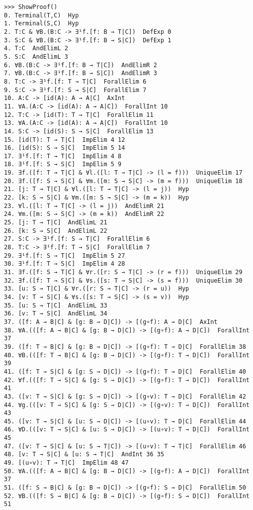 \documentclass[a4paper,12pt,leqno]{article}
\numberwithin{equation}{section}
\begin{document}
\begin{verbatim}
>>> ShowProof()
0. Terminal(T,C)  Hyp 
1. Terminal(S,C)  Hyp 
2. T:C & ∀B.(B:C -> ∃¹f.[f: B → T|C])  DefExp 0
3. S:C & ∀B.(B:C -> ∃¹f.[f: B → S|C])  DefExp 1
4. T:C  AndElimL 2
5. S:C  AndElimL 3
6. ∀B.(B:C -> ∃¹f.[f: B → T|C])  AndElimR 2
7. ∀B.(B:C -> ∃¹f.[f: B → S|C])  AndElimR 3
8. T:C -> ∃¹f.[f: T → T|C]  ForallElim 6
9. S:C -> ∃¹f.[f: S → S|C]  ForallElim 7
10. A:C -> [id(A): A → A|C]  AxInt 
11. ∀A.(A:C -> [id(A): A → A|C])  ForallInt 10
12. T:C -> [id(T): T → T|C]  ForallElim 11
13. ∀A.(A:C -> [id(A): A → A|C])  ForallInt 10
14. S:C -> [id(S): S → S|C]  ForallElim 13
15. [id(T): T → T|C]  ImpElim 4 12
16. [id(S): S → S|C]  ImpElim 5 14
17. ∃¹f.[f: T → T|C]  ImpElim 4 8
18. ∃¹f.[f: S → S|C]  ImpElim 5 9
19. ∃f.([f: T → T|C] & ∀l.([l: T → T|C] -> (l = f)))  UniqueElim 17
20. ∃f.([f: S → S|C] & ∀m.([m: S → S|C] -> (m = f)))  UniqueElim 18
21. [j: T → T|C] & ∀l.([l: T → T|C] -> (l = j))  Hyp 
22. [k: S → S|C] & ∀m.([m: S → S|C] -> (m = k))  Hyp 
23. ∀l.([l: T → T|C] -> (l = j))  AndElimR 21
24. ∀m.([m: S → S|C] -> (m = k))  AndElimR 22
25. [j: T → T|C]  AndElimL 21
26. [k: S → S|C]  AndElimL 22
27. S:C -> ∃¹f.[f: S → T|C]  ForallElim 6
28. T:C -> ∃¹f.[f: T → S|C]  ForallElim 7
29. ∃¹f.[f: S → T|C]  ImpElim 5 27
30. ∃¹f.[f: T → S|C]  ImpElim 4 28
31. ∃f.([f: S → T|C] & ∀r.([r: S → T|C] -> (r = f)))  UniqueElim 29
32. ∃f.([f: T → S|C] & ∀s.([s: T → S|C] -> (s = f)))  UniqueElim 30
33. [u: S → T|C] & ∀r.([r: S → T|C] -> (r = u))  Hyp 
34. [v: T → S|C] & ∀s.([s: T → S|C] -> (s = v))  Hyp 
35. [u: S → T|C]  AndElimL 33
36. [v: T → S|C]  AndElimL 34
37. ([f: A → B|C] & [g: B → D|C]) -> [(g∘f): A → D|C]  AxInt 
38. ∀A.(([f: A → B|C] & [g: B → D|C]) -> [(g∘f): A → D|C])  ForallInt 37
39. ([f: T → B|C] & [g: B → D|C]) -> [(g∘f): T → D|C]  ForallElim 38
40. ∀B.(([f: T → B|C] & [g: B → D|C]) -> [(g∘f): T → D|C])  ForallInt 39
41. ([f: T → S|C] & [g: S → D|C]) -> [(g∘f): T → D|C]  ForallElim 40
42. ∀f.(([f: T → S|C] & [g: S → D|C]) -> [(g∘f): T → D|C])  ForallInt 41
43. ([v: T → S|C] & [g: S → D|C]) -> [(g∘v): T → D|C]  ForallElim 42
44. ∀g.(([v: T → S|C] & [g: S → D|C]) -> [(g∘v): T → D|C])  ForallInt 43
45. ([v: T → S|C] & [u: S → D|C]) -> [(u∘v): T → D|C]  ForallElim 44
46. ∀D.(([v: T → S|C] & [u: S → D|C]) -> [(u∘v): T → D|C])  ForallInt 45
47. ([v: T → S|C] & [u: S → T|C]) -> [(u∘v): T → T|C]  ForallElim 46
48. [v: T → S|C] & [u: S → T|C]  AndInt 36 35
49. [(u∘v): T → T|C]  ImpElim 48 47
50. ∀A.(([f: A → B|C] & [g: B → D|C]) -> [(g∘f): A → D|C])  ForallInt 37
51. ([f: S → B|C] & [g: B → D|C]) -> [(g∘f): S → D|C]  ForallElim 50
52. ∀B.(([f: S → B|C] & [g: B → D|C]) -> [(g∘f): S → D|C])  ForallInt 51

\end{verbatim}
\end{document}
